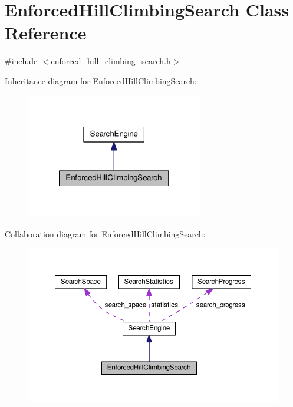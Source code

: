 \hypertarget{classEnforcedHillClimbingSearch}{\section{Enforced\-Hill\-Climbing\-Search Class Reference}
\label{classEnforcedHillClimbingSearch}
}


{\ttfamily \#include $<$enforced\-\_\-hill\-\_\-climbing\-\_\-search.\-h$>$}



Inheritance diagram for Enforced\-Hill\-Climbing\-Search\-:
\nopagebreak
\begin{figure}[H]
\begin{center}
\leavevmode
\includegraphics[width=218pt]{classEnforcedHillClimbingSearch__inherit__graph}
\end{center}
\end{figure}


Collaboration diagram for Enforced\-Hill\-Climbing\-Search\-:
\nopagebreak
\begin{figure}[H]
\begin{center}
\leavevmode
\includegraphics[width=350pt]{classEnforcedHillClimbingSearch__coll__graph}
\end{center}
\end{figure}
